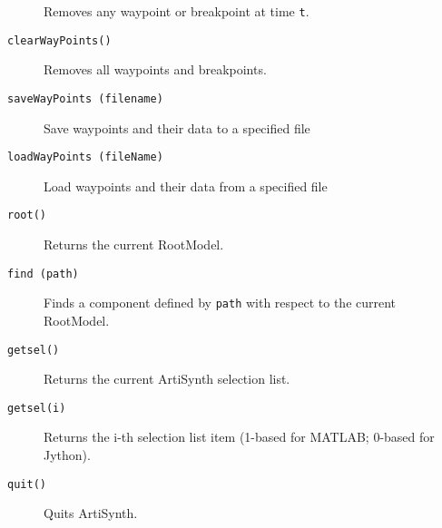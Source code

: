\documentclass{article}
\begin{document}
\begin{description}
Removes any waypoint or breakpoint at time {\tt t}.

\item[{\tt clearWayPoints()}] \mbox{}

Removes all waypoints and breakpoints.

\item[{\tt saveWayPoints (filename)}] \mbox{}

Save waypoints and their data to a specified file

\item[{\tt loadWayPoints (fileName)}] \mbox{}

Load waypoints and their data from a specified file

\item[{\tt root()}] \mbox{}

Returns the current RootModel.

\item[{\tt find (path)}] \mbox{}

Finds a component defined by {\tt path} with respect to the current RootModel.

\item[{\tt getsel()}] \mbox{}

Returns the current ArtiSynth selection list.

\item[{\tt getsel(i)}] \mbox{}

Returns the i-th selection list item (1-based for MATLAB; 0-based for Jython).

\item[{\tt quit()}] \mbox{}

Quits ArtiSynth.

\end{description}
\end{document}
